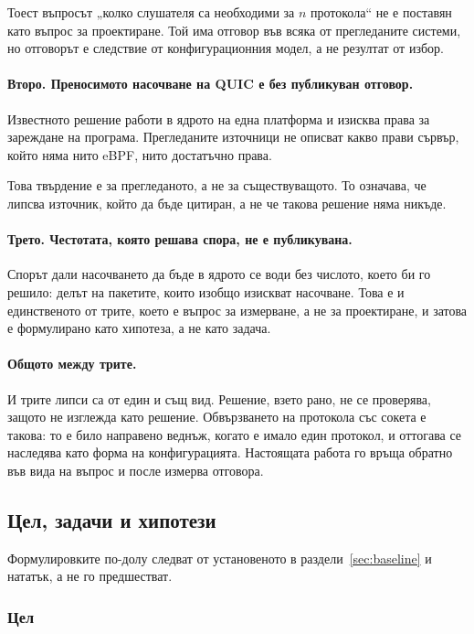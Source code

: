 Тоест въпросът „колко слушателя са необходими за $n$ протокола“ не е поставян като въпрос за
проектиране. Той има отговор във всяка от прегледаните системи, но отговорът е следствие от
конфигурационния модел, а не резултат от избор.

\paragraph{Второ. Преносимото насочване на QUIC е без публикуван отговор.} Известното решение
работи в ядрото на една платформа и изисква права за зареждане на програма. Прегледаните
източници не описват какво прави сървър, който няма нито eBPF, нито достатъчно права.

Това твърдение е за прегледаното, а не за съществуващото. То означава, че липсва източник,
който да бъде цитиран, а не че такова решение няма никъде.

\paragraph{Трето. Честотата, която решава спора, не е публикувана.} Спорът дали насочването да
бъде в ядрото се води без числото, което би го решило: делът на пакетите, които изобщо
изискват насочване. Това е и единственото от трите, което е въпрос за измерване, а не за
проектиране, и затова е формулирано като хипотеза, а не като задача.

\paragraph{Общото между трите.} И трите липси са от един и същ вид. Решение, взето рано, не се
проверява, защото не изглежда като решение. Обвързването на протокола със сокета е такова: то
е било направено веднъж, когато е имало един протокол, и оттогава се наследява като форма на
конфигурацията. Настоящата работа го връща обратно във вида на въпрос и после измерва отговора.

\subsection{Цел, задачи и хипотези}
\label{sec:goal}

Формулировките по-долу следват от установеното в раздели~\ref{sec:baseline} и нататък, а не
го предшестват.

\subsubsection{Цел}

